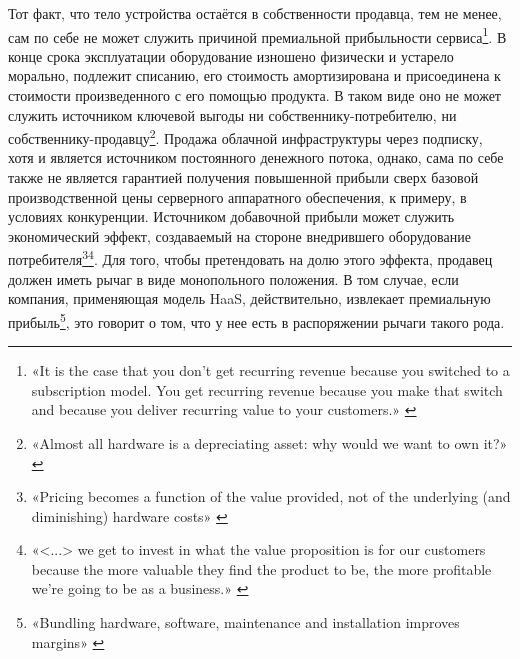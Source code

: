 \documentclass{article}
\begin{document}
Тот факт, что тело устройства остаётся в собственности продавца, тем не менее, сам по себе не может служить причиной премиальной прибыльности сервиса\footnote{«It is the case that you don’t get recurring revenue because you switched to a subscription model. You get recurring revenue because you make that switch and because you deliver recurring value to your customers.» \cite{robbiekellmanbaxterBenFosterWhoop2022}}. В конце срока эксплуатации оборудование изношено физически и устарело морально, подлежит списанию, его стоимость амортизирована и присоединена к стоимости произведенного с его помощью продукта. В таком виде оно не может служить источником ключевой выгоды ни собственнику-потребителю, ни собственнику-продавцу\footnote{«Almost all hardware is a depreciating asset: why would we want to own it?» \cite{howHaasWillSaveIot2016}}. Продажа облачной инфраструктуры через подписку, хотя и является источником постоянного денежного потока, однако, сама по себе также не является гарантией получения повышенной прибыли сверх базовой производственной цены серверного аппаратного обеспечения, к примеру, в условиях конкуренции. Источником добавочной прибыли может служить экономический эффект, создаваемый на стороне внедрившего оборудование потребителя\footnote{«Pricing becomes a function of the value provided, not of the underlying (and diminishing) hardware costs» \cite{howHaasWillSaveIot2016}}\footnote{«<...> we get to invest in what the value proposition is for our customers because the more valuable they find the product to be, the more profitable we’re going to be as a business.» \cite{robbiekellmanbaxterBenFosterWhoop2022}}. Для того, чтобы претендовать на долю этого эффекта, продавец должен иметь рычаг в виде монопольного положения. В том случае, если компания, применяющая модель HaaS, действительно, извлекает премиальную прибыль\footnote{«Bundling hardware, software, maintenance and installation improves margins» \cite{howHaasWillSaveIot2016}}, это говорит о том, что у нее есть в распоряжении рычаги такого рода.
\end{document}
